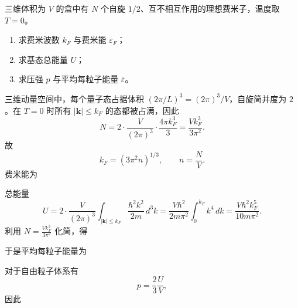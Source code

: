\begin{question}[18分]
三维体积为 $V$ 的盒中有 $N$ 个自旋 $1/2$、互不相互作用的理想费米子，温度取 $T=0$。
\begin{enumerate}[label=（\arabic*）,leftmargin=2.8em,itemsep=0.2em]
\item 求费米波数 $k_F$ 与费米能 $\varepsilon_F$；
\item 求基态总能量 $U$；
\item 求压强 $p$ 与平均每粒子能量 $\bar\varepsilon$。
\end{enumerate}
\begin{solution}

三维动量空间中，每个量子态占据体积 $(2\pi/L)^3=(2\pi)^3/V$，自旋简并度为 $2$。在 $T=0$ 时所有 $|\bm k|\le k_F$ 的态都被占满，因此
\[
N=2\cdot \frac{V}{(2\pi)^3}\cdot \frac{4\pi k_F^3}{3}
=\frac{Vk_F^3}{3\pi^2}.
\]
故
\[
k_F=(3\pi^2 n)^{1/3},\qquad n=\frac{N}{V}.
\]
费米能为

总能量
\[
U=2\cdot \frac{V}{(2\pi)^3}\int_{|\bm k|\le k_F}\frac{\hbar^2k^2}{2m}\,d^3k
=\frac{V\hbar^2}{2m\pi^2}\int_0^{k_F}k^4\,dk
=\frac{V\hbar^2k_F^5}{10m\pi^2}.
\]
利用 $N=\frac{Vk_F^3}{3\pi^2}$ 化简，得

于是平均每粒子能量为

对于自由粒子体系有
\[
p=\frac{2}{3}\frac{U}{V},
\]
因此
\end{solution}
\end{question}

